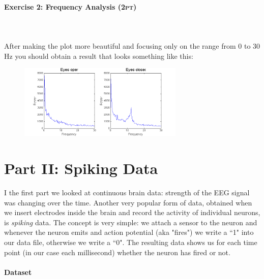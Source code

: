 \documentclass[a4paper,11pt]{article}
\newenvironment{exercise}[3]{\paragraph{Exercise #1: #2 \textsc{(#3pt)}}\ \\}{
\medskip}
\begin{document}
\begin{exercise}{2}{Frequency Analysis}{2}
\ \\
After making the plot more beautiful and focusing only on the range from 0 to 30 Hz you should obtain a result that looks something like this:
\begin{figure}[H]
   \centering
   \includegraphics[width=0.7\textwidth]{fouriereyes.png} 
\end{figure}
\end{exercise}

\section{Part II: Spiking Data}
I the first part we looked at continuous brain data: strength of the EEG signal was changing over the time. Another very popular form of data, obtained when we insert electrodes inside the brain and record the activity of individual neurons, is \emph{spiking} data. The concept is very simple: we attach a sensor to the neuron and whenever the neuron emits and action potential (aka "fires") we write a ``1" into our data file, otherwise we write a ``0". The resulting data shows us for each time point (in our case each millisecond) whether the neuron has fired or not.\\
\ \\
\textbf{Dataset}
\end{document}
